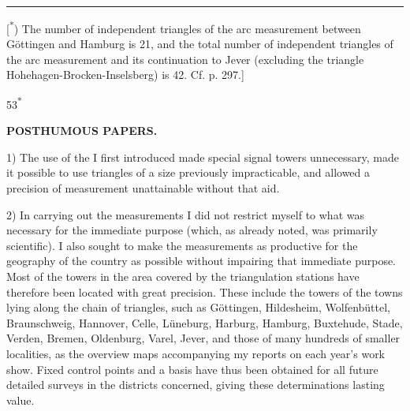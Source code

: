 \par\smallskip\noindent\rule{.24\linewidth}{.4pt}\par\smallskip
{\footnotesize\noindent\hspace*{\parindent}[\textsuperscript{*}) The number of independent triangles of the arc measurement between Göttingen and Hamburg is 21, and the total number of independent triangles of the arc measurement and its continuation to Jever (excluding the triangle Hohehagen-Brocken-Inselsberg) is 42. Cf. p. 297.]\par}

\par\smallskip\noindent\hfill{\footnotesize 53\textsuperscript{*}}\hspace*{.12\linewidth}\par

\par\clearpage
\noindent{}\hfill{\small\textbf{POSTHUMOUS PAPERS.}}\hfill\null\par\medskip

\par\noindent\hspace*{\parindent}1) The use of the  I first introduced made special signal towers unnecessary, made it possible to use triangles of a size previously impracticable, and allowed a precision of measurement unattainable without that aid.

\par\noindent\hspace*{\parindent}2) In carrying out the measurements I did not restrict myself to what was necessary for the immediate purpose (which, as already noted, was primarily scientific). I also sought to make the measurements as productive for the geography of the country as possible without impairing that immediate purpose. Most of the towers in the area covered by the triangulation stations have therefore been located with great precision. These include the towers of the towns lying along the chain of triangles, such as Göttingen, Hildesheim, Wolfenbüttel, Braunschweig, Hannover, Celle, Lüneburg, Harburg, Hamburg, Buxtehude, Stade, Verden, Bremen, Oldenburg, Varel, Jever, and those of many hundreds of smaller localities, as the overview maps accompanying my reports on each year's work show. Fixed control points and a basis have thus been obtained for all future detailed surveys in the districts concerned, giving these determinations lasting value.

